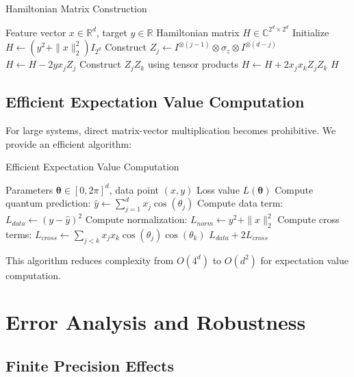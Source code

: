 \documentclass[11pt]{article}
\begin{document}
\begin{algorithm}[H]
\caption{Hamiltonian Matrix Construction}
\begin{algorithmic}[1]
\Require Feature vector $x \in \mathbb{R}^d$, target $y \in \mathbb{R}$
\Ensure Hamiltonian matrix $H \in \mathbb{C}^{2^d \times 2^d}$
\State Initialize $H \leftarrow (y^2 + \|x\|_2^2) I_{2^d}$
    \State Construct $Z_j \leftarrow I^{\otimes(j-1)} \otimes \sigma_z \otimes I^{\otimes(d-j)}$
    \State $H \leftarrow H - 2y x_j Z_j$
\EndFor
{}
        \State Construct $Z_j Z_k$ using tensor products
        \State $H \leftarrow H + 2x_j x_k Z_j Z_k$
    \EndFor
\EndFor
\Return $H$
\end{algorithmic}
\end{algorithm}

\subsection{Efficient Expectation Value Computation}

For large systems, direct matrix-vector multiplication becomes prohibitive. We provide an efficient algorithm:

\begin{algorithm}[H]
\caption{Efficient Expectation Value Computation}
\begin{algorithmic}[1]
\Require Parameters $\bm{\theta} \in [0,2\pi]^d$, data point $(x,y)$
\Ensure Loss value $L(\bm{\theta})$
\State Compute quantum prediction: $\hat{y} \leftarrow \sum_{j=1}^d x_j \cos(\theta_j)$
\State Compute data term: $L_{data} \leftarrow (y - \hat{y})^2$
\State Compute normalization: $L_{norm} \leftarrow y^2 + \|x\|_2^2$
\State Compute cross terms: $L_{cross} \leftarrow \sum_{j<k} x_j x_k \cos(\theta_j) \cos(\theta_k)$
\Return $L_{data} + 2L_{cross}$
\end{algorithmic}
\end{algorithm}

This algorithm reduces complexity from $O(4^d)$ to $O(d^2)$ for expectation value computation.

\section{Error Analysis and Robustness}

\subsection{Finite Precision Effects}
\end{document}
